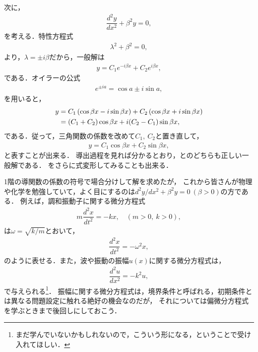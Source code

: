 次に，
\begin{align}
  \dfrac{d^2 y}{dx^2} + \beta^{2} y = 0, \label{eq:PDE_05_02}
\end{align}
を考える．特性方程式
\begin{align}
  \lambda^2 + \beta^2 = 0,
\end{align}
より，$\lambda = \pm i\beta$だから，一般解は
\begin{align}
  y = C_1 e^{-i\beta x} + C_{2} e^{i\beta x}, \label{eq:PDE_05_02_sol_01} 
\end{align}
である．オイラーの公式
\begin{align}
  e^{\pm i a} = \cos a \pm i\sin a, 
\end{align}
を用いると，
\begin{align}
  y & =  C_{1}\left(\cos \beta x - i \sin \beta x\right) 
       + C_{2}\left(\cos \beta x + i \sin \beta x\right) \notag \\
    & =  \left(C_1 + C_2 \right)\cos \beta x + i (C_2 - C_1) \sin \beta x,
\end{align}
である．従って，三角関数の係数を改めて$C_1,~C_2$と置き直して，
\begin{align}
  y = C_1 \cos \beta x + C_2 \sin \beta x, \label{eq:PDE_05_02_sol_02}
\end{align}
と表すことが出来る．
導出過程を見れば分かるとおり，とのどちらも正しい一般解である．
をさらに式変形してみることも出来る．

1階の導関数の係数の符号で場合分けして解を求めたが，
これから皆さんが物理や化学を勉強していて，よく目にするのは$d^2y/dx^2+\beta^2 y = 0~(\beta>0)$の方である．
例えば，調和振動子に関する微分方程式
\begin{align}
  m \dfrac{d^2 x}{dt^2} = -k x, \quad (m>0,~k>0), 
\end{align}
は$\omega = \sqrt{k/m}$とおいて，
\begin{align}
 \dfrac{d^2 x}{dt^2} = -\omega^2 x, 
\end{align}
のように表せる．また，波や振動の振幅$u(x)$に関する微分方程式は，
\begin{align}
 \dfrac{d^2 u}{dx^2} = -k^2 u, 
\end{align}
で与えられる\footnote{まだ学んでいないかもしれないので，こういう形になる，ということで受け入れてほしい．}．
振幅に関する微分方程式は，境界条件と呼ばれる，初期条件とは異なる問題設定に触れる絶好の機会なのだが，
それについては偏微分方程式を学ぶときまで後回しにしておこう．

